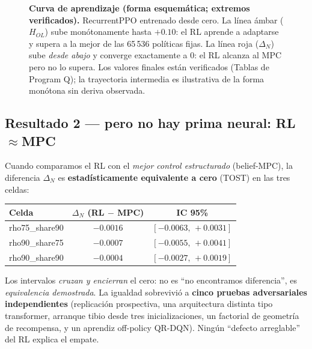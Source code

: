 \documentclass[11pt,a4paper]{article}
\begin{document}
\begin{figure}[H]
\centering
{}
\caption{\textbf{Curva de aprendizaje (forma esquemática; extremos verificados).} RecurrentPPO
entrenado desde cero. La línea ámbar ($H_{OL}$) sube monótonamente hasta ${+}0.10$: el RL aprende a
adaptarse y supera a la mejor de las 65\,536 políticas fijas. La línea roja ($\Delta_N$) sube
\emph{desde abajo} y converge exactamente a $0$: el RL alcanza al MPC pero no lo supera. Los valores
finales están verificados (Tablas de Program Q); la trayectoria intermedia es ilustrativa de la forma
monótona sin deriva observada.}
\label{fig:curva}
\end{figure}

\subsection{Resultado 2 — pero no hay prima neural: RL${\approx}$MPC}
Cuando comparamos el RL con el \emph{mejor control estructurado} (belief-MPC), la diferencia
$\Delta_N$ es \textbf{estadísticamente equivalente a cero} (TOST) en las tres celdas:
\begin{center}
\begin{tabular}{lcc}
\toprule
Celda & $\Delta_N$ (RL $-$ MPC) & IC 95\% \\
\midrule
rho75\_share90 & $-0.0016$ & $[-0.0063,\,+0.0031]$ \\
rho90\_share75 & $-0.0007$ & $[-0.0055,\,+0.0041]$ \\
rho90\_share90 & $-0.0004$ & $[-0.0027,\,+0.0019]$ \\
\bottomrule
\end{tabular}
\end{center}
Los intervalos \emph{cruzan y encierran} el cero: no es ``no encontramos diferencia'', es
\emph{equivalencia demostrada}. La igualdad sobrevivió a \textbf{cinco pruebas adversariales
independientes} (replicación prospectiva, una arquitectura distinta tipo transformer, arranque
tibio desde tres inicializaciones, un factorial de geometría de recompensa, y un aprendiz off-policy
QR-DQN). Ningún ``defecto arreglable'' del RL explica el empate.
\end{document}
